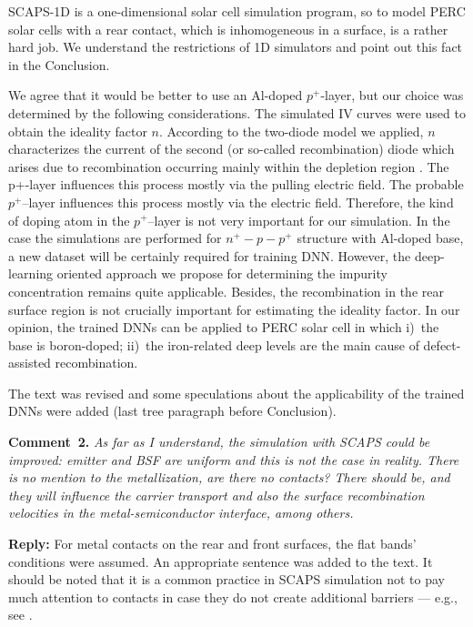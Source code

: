 \documentclass[num-refs]{wiley-article} %
\begin{document}
SCAPS-1D is a one-dimensional solar cell simulation program, so to model PERC solar cells with a rear contact, 
which is inhomogeneous in a surface, is a rather hard job. 
We understand the restrictions of 1D simulators and point out this fact in the Conclusion.

We agree that it would be better to use an Al-doped $p^+$-layer, but our choice was determined by the following considerations.
The simulated IV curves were used to obtain the ideality factor $n$.
According to the two-diode model we applied,
$n$ characterizes the current of the second (or so-called recombination) diode 
which arises due to recombination occurring mainly within the depletion region \citep{Breitenstein2013,n2McIntosh}.
The p+-layer influences this process mostly via the pulling electric field.
The probable $p^+$--layer influences this process mostly via the electric field.
Therefore, the kind of doping atom in the $p^+$--layer is not very important for our simulation.
In the case the simulations are performed for $n^+-p-p^+$ structure with Al-doped base, 
a new dataset will be certainly required for training DNN.
However, the deep-learning oriented approach we propose for determining the impurity concentration remains quite applicable.
Besides, the recombination in the rear surface region is not crucially important for estimating the ideality factor.
In our opinion, the trained DNNs can be applied to PERC solar cell in which
i)~the base is boron-doped;
ii)~the iron-related deep levels are the main cause of defect-assisted recombination.


The text was revised and some speculations about the applicability of the trained DNNs were added (last tree paragraph before Conclusion).


\vspace{1cm}
\noindent
\textcolor[rgb]{0.00,0.50,1.00}{\textbf{Comment~2.}}
\emph{As far as I understand, the simulation with SCAPS could be improved: emitter and BSF are uniform and this is not the case in reality.
There is no mention to the metallization, are there no contacts?
There should be, and they will influence the carrier transport and also the surface recombination velocities in the metal-semiconductor interface, among others.}

\vspace{0.5cm}
\noindent
\textcolor[rgb]{0.51,0.00,0.00}{\textbf{Reply:}}
For metal contacts on the rear and front surfaces, 
the flat bands' conditions were assumed. 
An appropriate sentence was added to the text. 
It should be noted that it is a common practice in SCAPS simulation not to pay much attention to contacts 
in case they do not create additional barriers --- e.g., see \cite{SCAPSuseSi4,SCAPSuseSi1,SCAPSuse1,SCAPSuse5,ScapsUse10}.
\end{document}
